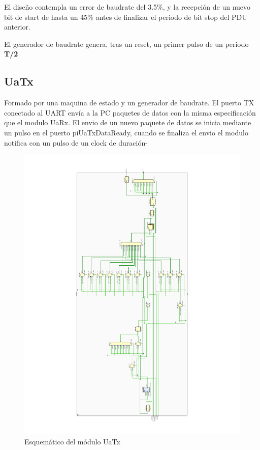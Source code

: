 \documentclass[12pt]{article}
\begin{document}
El diseño contempla un error de baudrate del 3.5\%, y la recepción de un nuevo bit de start de hasta un 45\% antes de finalizar el periodo de bit stop del PDU anterior.

El generador de baudrate genera, tras un reset, un primer pulso de un periodo \textbf{T/2}

\subsection{UaTx}
Formado por una maquina de estado y un generador de baudrate. El puerto TX conectado al UART envía a la PC paquetes de datos con la misma especificación que el modulo UaRx. El envio de un nuevo paquete de datos se inicia mediante un pulso en el puerto piUaTxDataReady, cuando se finaliza el envio el modulo notifica con un pulso de un clock de duración-

\begin{figure}[H]
    \centering
    \includegraphics[angle=270, width=\textwidth]{uart-tx}
    \caption{Esquemático del módulo UaTx}
\end{figure}
\end{document}
